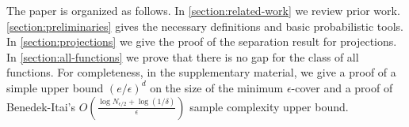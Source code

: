 The paper is organized as follows. In \autoref{section:related-work} we review
prior work. \autoref{section:preliminaries} gives the necessary definitions and
basic probabilistic tools. In \autoref{section:projections} we give the proof of
the separation result for projections. In \autoref{section:all-functions} we
prove that there is no gap for the class of all functions. For completeness, in
the supplementary material, we give a proof of a simple upper bound
$(e/\epsilon)^d$ on the size of the minimum $\epsilon$-cover and a proof of
Benedek-Itai's $O \left( \frac{\log N_{\epsilon/2} + \log
(1/\delta)}{\epsilon}\right)$ sample complexity upper bound.
